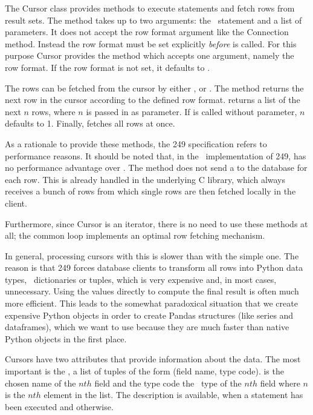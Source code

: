 The Cursor class provides methods to
execute statements and fetch rows from result sets.
The  method takes up to two arguments:
the \sql\ statement and a list of parameters.
It does not accept the row format argument like
the Connection method. Instead the row format
must be set explicitly \emph{before} 
is called. For this purpose Cursor provides the
method  which accepts one argument,
namely the row format. If the row format is not set,
it defaults to .

The rows can be fetched from the cursor by either
,
 or
.
The method  returns the next row
in the cursor according to the defined row format.
 returns a list of the next $n$ rows,
where $n$ is passed in as parameter. If 
is called without parameter, $n$ defaults to 1.
Finally,  fetches all rows at once.

\enlargethispage*{100cm}
As a rationale to provide these methods,
the  249 specification refers
to performance reasons. It should be noted
that, in the \nowdb\ implementation of
 249,  has no performance
advantage over .
The method does not send a 
to the database for each row.
This is already handled in the underlying
C library, which always receives a bunch of rows
from which single rows are then fetched locally
in the client.
\clearpage

Furthermore, since Cursor is an iterator,
there is no need to use these methods at all;
the common  loop implements an optimal
row fetching mechanism.

In general, processing cursors with this 
is slower than with the simple one.
The reason is that  249 forces
database clients to transform all rows into Python
data types, \viz\ dictionaries or tuples,
which is very expensive and, in most cases,
unnecessary.
Using the values directly to compute the final result
is often much more efficient.
This leads to the somewhat paradoxical situation
that we create expensive Python objects
in order to create Pandas structures (like series and
dataframes), which we want to use because they
are much faster than native Python objects in the first place.

Cursors have two attributes that provide information
about the data. The most important is the ,
a list of tuples of the form (field name, type code).
 is the chosen name of the $nth$ field
and the type code the \nowdb\ type of the $nth$ field where
$n$ is the $nth$ element in the list.
The description is available, when a  statement
has been executed and  otherwise.

